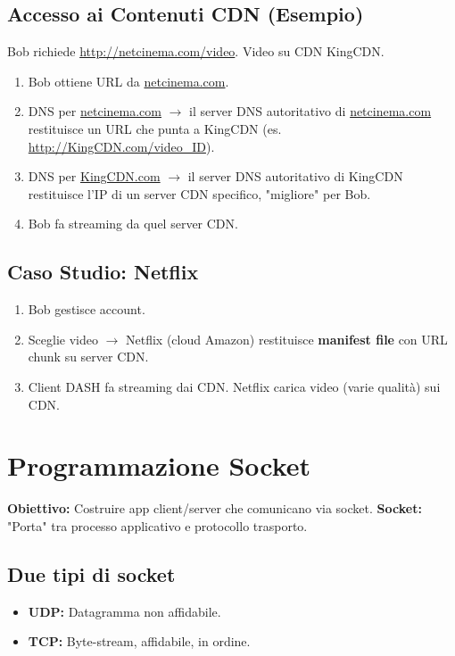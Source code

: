 \subsection{Accesso ai Contenuti CDN (Esempio)}
Bob richiede \url{http://netcinema.com/video}. Video su CDN KingCDN.
\begin{enumerate}
    \item Bob ottiene URL da \url{netcinema.com}.
    \item DNS per \url{netcinema.com} $\rightarrow$ il server DNS autoritativo di \url{netcinema.com} restituisce un URL che punta a KingCDN (es. \url{http://KingCDN.com/video_ID}).
    \item DNS per \url{KingCDN.com} $\rightarrow$ il server DNS autoritativo di KingCDN restituisce l'IP di un server CDN specifico, "migliore" per Bob.
    \item Bob fa streaming da quel server CDN.
\end{enumerate}

\subsection{Caso Studio: Netflix}
\begin{enumerate}
    \item Bob gestisce account.
    \item Sceglie video $\rightarrow$ Netflix (cloud Amazon) restituisce \textbf{manifest file} con URL chunk su server CDN.
    \item Client DASH fa streaming dai CDN. Netflix carica video (varie qualità) sui CDN.
\end{enumerate}

\section{Programmazione Socket}
\textbf{Obiettivo:} Costruire app client/server che comunicano via socket.
\textbf{Socket:} "Porta" tra processo applicativo e protocollo trasporto.

\subsection{Due tipi di socket}
\begin{itemize}
    \item \textbf{UDP:} Datagramma non affidabile.
    \item \textbf{TCP:} Byte-stream, affidabile, in ordine.
\end{itemize}

